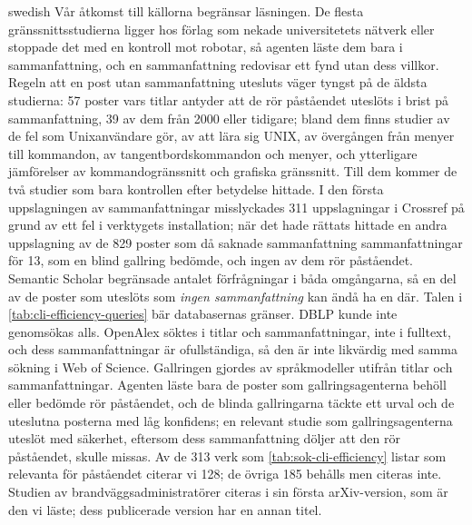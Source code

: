 \begin{onlyin}{swedish}
Vår åtkomst till källorna begränsar läsningen.  De flesta
gränssnittsstudierna ligger hos förlag som nekade universitetets nätverk
eller stoppade det med en kontroll mot robotar, så agenten läste dem
bara i
sammanfattning, och en sammanfattning redovisar ett fynd utan dess
villkor.  Regeln att en post utan sammanfattning utesluts väger tyngst
på de äldsta studierna: 57 poster vars titlar antyder att de rör
påståendet uteslöts i brist på sammanfattning, 39 av dem från 2000 eller
tidigare; bland dem finns studier av de fel som Unixanvändare gör, av att
lära sig UNIX, av övergången från menyer till kommandon, av
tangentbordskommandon och menyer, och ytterligare jämförelser av
kommandogränssnitt och grafiska gränssnitt.  Till dem kommer de två
studier som bara kontrollen efter betydelse hittade.  I den första
uppslagningen av sammanfattningar misslyckades 311 uppslagningar i
Crossref på grund av ett fel i verktygets installation; när det hade
rättats hittade en andra uppslagning av de 829 poster som då saknade
sammanfattning sammanfattningar för 13, som en blind gallring bedömde,
och ingen av dem rör påståendet.  Semantic Scholar begränsade antalet
förfrågningar i båda omgångarna, så en del av de poster som uteslöts som
\emph{ingen sammanfattning} kan ändå ha en där.  Talen i
\cref{tab:cli-efficiency-queries} bär databasernas gränser.  DBLP kunde
inte genomsökas alls.  OpenAlex söktes i titlar och sammanfattningar,
inte i fulltext, och dess sammanfattningar är ofullständiga, så den är
inte likvärdig med samma sökning i Web of Science.  Gallringen gjordes av
språkmodeller utifrån titlar och sammanfattningar.  Agenten läste bara de
poster som gallringsagenterna behöll eller bedömde rör påståendet, och de
blinda gallringarna täckte ett urval och de uteslutna posterna med låg
konfidens; en relevant studie som gallringsagenterna uteslöt med
säkerhet, eftersom dess sammanfattning döljer att den rör påståendet,
skulle missas.  Av de 313 verk som \cref{tab:sok-cli-efficiency} listar
som relevanta för påståendet citerar vi 128; de övriga 185 behålls men
citeras inte.  Studien av brandväggsadministratörer citeras i sin första
arXiv-version, som är den vi läste; dess publicerade version har en annan
titel.
\end{onlyin}

\section{} %
\label{sec:cli-efficiency-conclusion}


